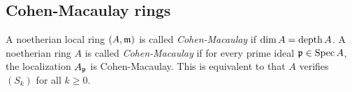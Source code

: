         


\subsection{Cohen-Macaulay rings}

    \begin{definition}\label{def: Cohen-Macaulay}
        A noetherian local ring $(A,{\mathfrak{m}})$ is called \textit{Cohen-Macaulay} if $\dim A = \operatorname{depth} A$.
        A noetherian ring $A$ is called \textit{Cohen-Macaulay} if for every prime ideal ${\mathfrak{p}} \in \operatorname{Spec} A$, the localization $A_{\mathfrak{p}}$ is Cohen-Macaulay.
        This is equivalent to that \(A\) verifies $(S_k)$ for all \(k \geq 0\).
    \end{definition}

    \begin{example}
    \end{example}


